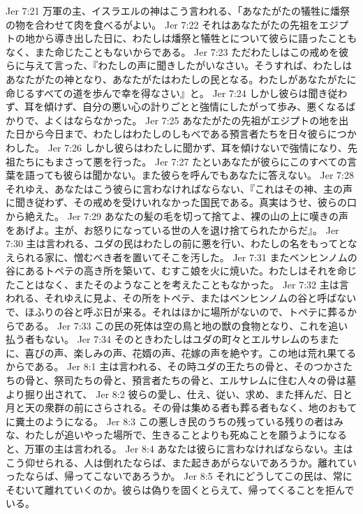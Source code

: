 Jer 7:21  万軍の主、イスラエルの神はこう言われる、「あなたがたの犠牲に燔祭の物を合わせて肉を食べるがよい。
Jer 7:22  それはあなたがたの先祖をエジプトの地から導き出した日に、わたしは燔祭と犠牲とについて彼らに語ったこともなく、また命じたこともないからである。
Jer 7:23  ただわたしはこの戒めを彼らに与えて言った、『わたしの声に聞きしたがいなさい。そうすれば、わたしはあなたがたの神となり、あなたがたはわたしの民となる。わたしがあなたがたに命じるすべての道を歩んで幸を得なさい』と。
Jer 7:24  しかし彼らは聞き従わず、耳を傾けず、自分の悪い心の計りごとと強情にしたがって歩み、悪くなるばかりで、よくはならなかった。
Jer 7:25  あなたがたの先祖がエジプトの地を出た日から今日まで、わたしはわたしのしもべである預言者たちを日々彼らにつかわした。
Jer 7:26  しかし彼らはわたしに聞かず、耳を傾けないで強情になり、先祖たちにもまさって悪を行った。
Jer 7:27  たといあなたが彼らにこのすべての言葉を語っても彼らは聞かない。また彼らを呼んでもあなたに答えない。
Jer 7:28  それゆえ、あなたはこう彼らに言わなければならない、『これはその神、主の声に聞き従わず、その戒めを受けいれなかった国民である。真実はうせ、彼らの口から絶えた。
Jer 7:29  あなたの髪の毛を切って捨てよ、裸の山の上に嘆きの声をあげよ。主が、お怒りになっている世の人を退け捨てられたからだ』。
Jer 7:30  主は言われる、ユダの民はわたしの前に悪を行い、わたしの名をもってとなえられる家に、憎むべき者を置いてそこを汚した。
Jer 7:31  またベンヒンノムの谷にあるトペテの高き所を築いて、むすこ娘を火に焼いた。わたしはそれを命じたことはなく、またそのようなことを考えたこともなかった。
Jer 7:32  主は言われる、それゆえに見よ、その所をトペテ、またはベンヒンノムの谷と呼ばないで、ほふりの谷と呼ぶ日が来る。それはほかに場所がないので、トペテに葬るからである。
Jer 7:33  この民の死体は空の鳥と地の獣の食物となり、これを追い払う者もない。
Jer 7:34  そのときわたしはユダの町々とエルサレムのちまたに、喜びの声、楽しみの声、花婿の声、花嫁の声を絶やす。この地は荒れ果てるからである。
Jer 8:1  主は言われる、その時ユダの王たちの骨と、そのつかさたちの骨と、祭司たちの骨と、預言者たちの骨と、エルサレムに住む人々の骨は墓より掘り出されて、
Jer 8:2  彼らの愛し、仕え、従い、求め、また拝んだ、日と月と天の衆群の前にさらされる。その骨は集める者も葬る者もなく、地のおもてに糞土のようになる。
Jer 8:3  この悪しき民のうちの残っている残りの者はみな、わたしが追いやった場所で、生きることよりも死ぬことを願うようになると、万軍の主は言われる。
Jer 8:4  あなたは彼らに言わなければならない。主はこう仰せられる、人は倒れたならば、また起きあがらないであろうか。離れていったならば、帰ってこないであろうか。
Jer 8:5  それにどうしてこの民は、常にそむいて離れていくのか。彼らは偽りを固くとらえて、帰ってくることを拒んでいる。
